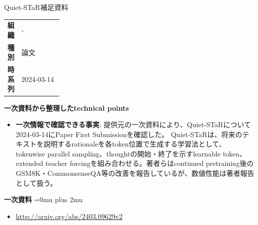 \Needspace{0.38\textheight}
\begin{technicalnote}{Quiet-STaR}{補足資料}
\begingroup
\begin{tabularx}{\linewidth}{@{}>{\bfseries}p{0.22\linewidth}X@{}}
組織 & - \\
種別 & 論文 \\
時系列 & 2024-03-14 \\
\end{tabularx}
\smallskip
\begin{minipage}{\linewidth}
{\bfseries 一次資料から整理したtechnical points}
\begin{itemize}[leftmargin=1.5em,itemsep=0.35em]
\item \textbf{一次情報で確認できる事実}: 提供元の一次資料により、Quiet-STaRについて2024-03-14にPaper First Submissionを確認した。 Quiet-STaRは、将来のテキストを説明するrationaleを各token位置で生成する学習法として、tokenwise parallel sampling、thoughtの開始・終了を示すlearnable token、extended teacher forcingを組み合わせる。著者らはcontinued pretraining後のGSM8K・CommonsenseQA等の改善を報告しているが、数値性能は著者報告として扱う。
\end{itemize}
\begin{minipage}{\linewidth}
\begin{samepage}
{\bfseries 一次資料}
\begingroup\sloppy
\Urlmuskip=0mu plus 2mu\relax
\begin{itemize}[leftmargin=1.5em,itemsep=0.25em]
\item {\scriptsize\url{http://arxiv.org/abs/2403.09629v2}}
\end{itemize}
\endgroup
\end{samepage}
\end{minipage}
\end{minipage}
\endgroup
\end{technicalnote}
\medskip
